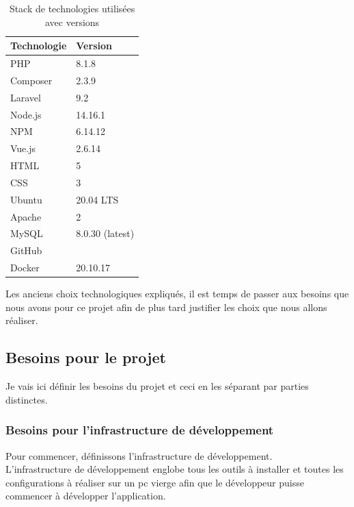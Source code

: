 \documentclass[
    iai, %
    il, %
]{heig-tb}
\begin{document}
\begin{table}[h]
    \begin{center}
        \caption{Stack de technologies utilisées avec versions \label{stack}}
        \begin{tabularx}{1.0\textwidth} {X|X}
            Technologie & Version         \\ \hline
            PHP         & 8.1.8           \\
            Composer    & 2.3.9           \\
            Laravel     & 9.2             \\
            Node.js     & 14.16.1         \\
            NPM         & 6.14.12         \\
            Vue.js      & 2.6.14          \\
            HTML        & 5               \\
            CSS         & 3               \\
            Ubuntu      & 20.04 LTS       \\
            Apache      & 2               \\
            MySQL       & 8.0.30 (latest) \\
            GitHub      &                 \\
            Docker      & 20.10.17        \\
        \end{tabularx}
    \end{center}
\end{table}

Les anciens choix technologiques expliqués, il est temps de passer aux besoins que nous avons pour ce projet afin de plus tard justifier les choix que nous allons réaliser.

\subsection{Besoins pour le projet}
Je vais ici définir les besoins du projet et ceci en les séparant par parties distinctes.

\subsubsection{Besoins pour l'infrastructure de développement}
Pour commencer, définissons l'infrastructure de développement.\\
L'infrastructure de développement englobe tous les outils à installer et toutes les configurations à réaliser sur un pc vierge afin que le développeur puisse commencer à développer l'application.
\end{document}
